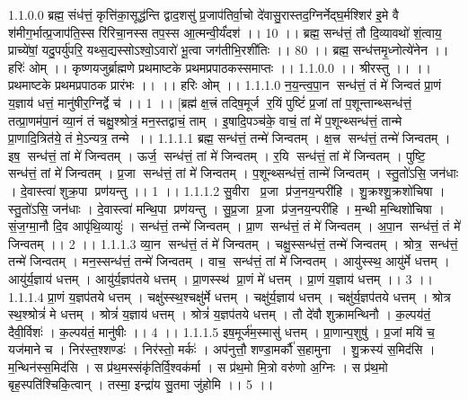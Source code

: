 1.1.0.0
ब्रह्म॒ संध॑त्तं॒ कृत्ति॑का॒सूद्ध॑न्ति द्वाद॒शसु॑ प्र॒जाप॑तिर्वा॒चो दे॑वासु॒रास्तद॒ग्निर्नेद्घ॒र्मश्शिर॑ इ॒मे वै श॑मीग॒र्भात्प्र॒जाप॑ति॒स्स रि॑रिचा॒नस्स तप॒स्स आ॒त्मन्वी॒र्यं॑दश॑ ।। 10 ।। ब्रह्म॒ सन्ध॑त्तं॒ तौ दि॒व्यावथो॑ शं॒त्वाय॒ प्राच्ये॑षां॒ यदु॒पर्यु॑परि॒ यथ्स॒द्यस्सोऽश्वो॒ऽवारो॑ भू॒त्वा जग॑तीभि॒रशी॑तिः ।। 80 ।। ब्रह्म॒ सन्ध॑त्तमृ॒ध्नोत्ये॑नेन ।। हरिः॑ ओम् ।। कृष्णयजुर्ब्राह्मणे प्रथमाष्टके प्रथमप्रपाठकस्समाप्तः ।।
1.1.0.0
।। श्रीरस्तु ।। ।। प्रथमाष्टके प्रथमप्रपाठक प्रारंभः ।। ।। हरिः ओम् ।।
1.1.1.0
न॒य॒न्त्व॒पा॒न सन्ध॑त्तं॒ तं मे॑ जिन्वतं प्रा॒णं य॒ज्ञाय॑ धत्तं॒ मानु॑षीर॒ग्निर्द्वे च॑ ।। 1 ।। [ब्रह्म॑ क्ष॒त्त्रं तदिष॒मूर्ज॑ र॒यिं पुष्टिं॑ प्र॒जां तां प॒शून्तान्थ्सन्ध॑त्तं॒ तत्प्रा॒णम॑पा॒नं व्या॒नं तं चक्षु॒श्श्रोत्रं॒ मन॒स्तद्वाचं॒ ताम् । इ॒षादि॒पञ्च॑के॒ वाचं॒ तां मे॑ प॒शून्थ्सन्ध॑त्तं॒ तान्मे प्रा॒णादि॒त्रित॑ये॒ तं मे॒ऽन्यत्र॒ तन्मे ।।
1.1.1.1
ब्रह्म॒ सन्ध॑त्तं॒ तन्मे॑ जिन्वतम् । क्ष॒त्त्र सन्ध॑त्तं॒ तन्मे॑ जिन्वतम् । इष॒॒ सन्ध॑त्तं॒ तां मे॑ जिन्वतम् । ऊर्ज॒॒ सन्ध॑त्तं॒ तां मे॑ जिन्वतम् । र॒यि सन्ध॑त्तं॒ तां मे॑ जिन्वतम् । पुष्टि॒॒ सन्ध॑त्तं॒ तां मे॑ जिन्वतम् । प्र॒जा सन्ध॑त्तं॒ तां मे॑ जिन्वतम् । प॒शून्थ्सन्ध॑त्तं॒ तान्मे॑ जिन्वतम् । स्तु॒तो॑ऽसि॒ जन॑धाः । दे॒वास्त्वा॑ शुक्र॒पा प्रण॑यन्तु ।। 1 ।।
1.1.1.2
सु॒वीरा प्र॒जा प्र॑ज॒नय॒न्परी॑हि । शु॒क्रश्शु॒क्रशो॑चिषा । स्तु॒तो॑ऽसि॒ जन॑धाः । दे॒वास्त्वा॑ मन्थि॒पा प्रण॑यन्तु । सु॒प्र॒जा प्र॒जा प्र॑ज॒नय॒न्परी॑हि । म॒न्थी म॒न्थिशो॑चिषा । सं॒ज॒ग्मा॒नौ दि॒व आपृ॑थि॒व्यायुः॑ । सन्ध॑त्तं॒ तन्मे॑ जिन्वतम् । प्रा॒ण सन्ध॑त्तं॒ तं मे॑ जिन्वतम् । अ॒पा॒न सन्ध॑त्तं॒ तं मे॑ जिन्वतम् ।। 2 ।।
1.1.1.3
व्या॒न सन्ध॑त्तं॒ तं मे॑ जिन्वतम् । चक्षु॒स्सन्ध॑त्तं॒ तन्मे॑ जिन्वतम् । श्रोत्र॒॒ सन्ध॑त्तं॒ तन्मे॑ जिन्वतम् । मन॒स्सन्ध॑त्तं॒ तन्मे॑ जिन्वतम् । वाच॒॒ सन्ध॑त्तं॒ तां मे॑ जिन्वतम् । आयु॑स्स्थ॒ आयु॑र्मे धत्तम् । आयु॑र्य॒ज्ञाय॑ धत्तम् । आयु॑र्य॒ज्ञप॑तये धत्तम् । प्रा॒णस्स्थ॑ प्रा॒णं मे॑ धत्तम् । प्रा॒णं य॒ज्ञाय॑ धत्तम् ।। 3 ।।
1.1.1.4
प्रा॒णं य॒ज्ञप॑तये धत्तम् । चक्षु॑स्स्थ॒श्चक्षु॑र्मे धत्तम् । चक्षु॑र्य॒ज्ञाय॑ धत्तम् । चक्षु॑र्य॒ज्ञप॑तये धत्तम् । श्रोत्र॑ स्थ॒श्श्रोत्रं॑ मे धत्तम् । श्रोत्रं॑ य॒ज्ञाय॑ धत्तम् । श्रोत्रं॑ य॒ज्ञप॑तये धत्तम् । तौ दे॑वौ शुक्रामन्थिनौ । क॒ल्पय॑तं॒ दैवी॒र्विशः॑ । क॒ल्पय॑तं॒ मानु॑षीः ।। 4 ।।
1.1.1.5
इष॒मूर्ज॑म॒स्मासु॑ धत्तम् । प्रा॒णान्प॒शुषु॑ । प्र॒जां मयि॑ च॒ यज॑माने च । निर॑स्त॒श्शण्डः॑ । निर॑स्तो॒ मर्कः॑ । अप॑नुत्तौ॒ शण्डा॒मर्कौ॑ स॒हामुना । शु॒क्रस्य॑ स॒मिद॑सि । म॒न्थिन॑स्स॒मिद॑सि । स प्र॑थ॒मस्संकृ॑तिर्वि॒श्वक॑र्मा । स प्र॑थ॒मो मि॒त्रो वरु॑णो अ॒ग्निः । स प्र॑थ॒मो बृह॒स्पति॑श्चिकि॒त्वान् । तस्मा॒ इन्द्रा॑य सु॒तमा जु॑होमि ।। 5 ।।
